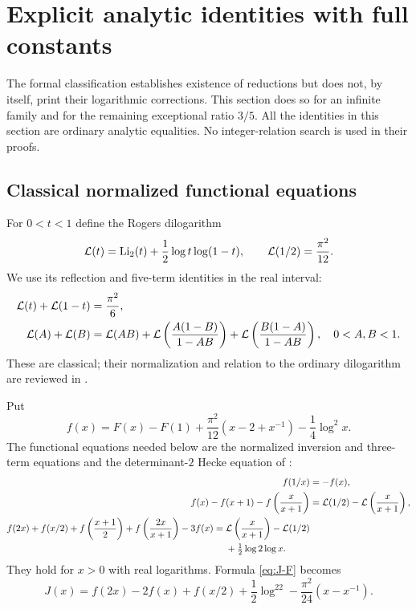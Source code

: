 \section{Explicit analytic identities with full constants}
\label{sec:identities}

The formal classification establishes existence of reductions but does
not, by itself, print their logarithmic corrections. This section does
so for an infinite family and for the remaining exceptional ratio
$3/5$. All the identities in this section are ordinary analytic
equalities. No integer-relation search is used in their proofs.

\subsection{Classical normalized functional equations}

For $0<t<1$ define the Rogers dilogarithm
\begin{equation}\label{eq:Rogers}
 \mathcal L(t)=\operatorname{Li}_2(t)+\frac12\log t\log(1-t),
 \qquad \mathcal L(1/2)=\frac{\pi^2}{12}.
\end{equation}
We use its reflection and five-term identities in the real interval:
\begin{align}
 \mathcal L(t)+\mathcal L(1-t)&=\frac{\pi^2}{6},\label{eq:Rog-reflect}\\
 \mathcal L(A)+\mathcal L(B)&=\mathcal L(AB)
  +\mathcal L\left(\frac{A(1-B)}{1-AB}\right)
  +\mathcal L\left(\frac{B(1-A)}{1-AB}\right),
 \quad 0<A,B<1.\label{eq:Rog-five}
\end{align}
These are classical; their normalization and relation to the ordinary
dilogarithm are reviewed in \cite{ZagierDilog,RZ}.

Put
\begin{equation}\label{eq:modified-F}
 f(x)=F(x)-F(1)+\frac{\pi^2}{12}(x-2+x^{-1})-\frac14\log^2x.
\end{equation}
The functional equations needed below are the normalized inversion and
three-term equations and the determinant-$2$ Hecke equation of
\cite[(15), (22a)]{RZ}:
\begin{align}
 f(1/x)&=-f(x),\label{eq:f-inversion}\\
 f(x)-f(x+1)-f\left(\frac{x}{x+1}\right)
 &=\mathcal L(1/2)-\mathcal L\left(\frac{x}{x+1}\right),\label{eq:f-three}\\
 \begin{split}
 f(2x)+f(x/2)+f\left(\frac{x+1}{2}\right)
 +f\left(\frac{2x}{x+1}\right)-3f(x)
 ={}&\mathcal L\left(\frac{x}{x+1}\right)-\mathcal L(1/2)\\
 &+\tfrac12\log2\log x.
 \end{split}\label{eq:f-Hecke}
\end{align}
They hold for $x>0$ with real logarithms. Formula \eqref{eq:J-F}
becomes
\begin{equation}\label{eq:J-f}
 J(x)=f(2x)-2f(x)+f(x/2)+\frac12\log^22
       -\frac{\pi^2}{24}(x-x^{-1}).
\end{equation}

